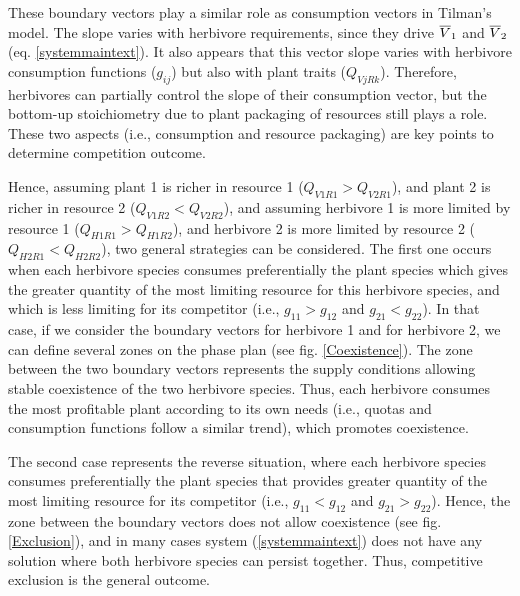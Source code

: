 \documentclass[12pt]{article}
\newcommand\barre[1]{\overline{\rule{0pt}{1.5ex}#1}}
\begin{document}
These boundary vectors play a similar role as consumption vectors in Tilman's model. %
The slope varies with herbivore requirements, since they drive $\barre{V}_1$ and $\barre{V}_2$ (eq. \ref{systemmaintext}). It also appears that this vector slope varies with herbivore consumption functions ($g_{ij}$) but also with plant traits ($Q_{VjRk}$). Therefore, herbivores can partially control the slope of their consumption vector, but the bottom-up stoichiometry due to plant packaging of resources still plays a role. 
These two aspects (i.e., consumption and resource packaging) are key points to determine competition outcome. 
\par
Hence, assuming plant 1 is richer in resource 1 ($Q_{V1R1}>Q_{V2R1}$), and plant 2 is richer in resource 2 ($Q_{V1R2}<Q_{V2R2}$), and assuming herbivore 1 is more limited by resource 1 ($Q_{H1R1}>Q_{H1R2}$), and herbivore 2 is more limited by resource 2 ($Q_{H2R1}<Q_{H2R2}$), two general strategies can be considered. The first one occurs when each herbivore species consumes preferentially the plant species which gives the greater quantity of the most limiting resource for this herbivore species, and which is less limiting for its competitor (i.e., $g_{11}>g_{12}$ and $g_{21}<g_{22}$). In that case, if we consider the boundary vectors for herbivore 1 and for herbivore 2, we can define several zones on the phase plan (see fig. \ref{Coexistence}). The zone between the two boundary vectors represents the supply conditions allowing stable coexistence of the two herbivore species. Thus, each herbivore consumes the most profitable plant according to its own needs (i.e., quotas and consumption functions follow a similar trend), %
which promotes coexistence.
\par
The second case represents the reverse situation, where each herbivore species consumes preferentially the plant species that provides greater quantity of the most limiting resource for its competitor (i.e., $g_{11}<g_{12}$ and $g_{21}>g_{22}$). Hence, the zone between the boundary vectors does not allow coexistence (see fig.  \ref{Exclusion}), and in many cases system (\ref{systemmaintext}) does not have any solution where both herbivore species can persist together. Thus, competitive exclusion is the general outcome. 
\end{document}
